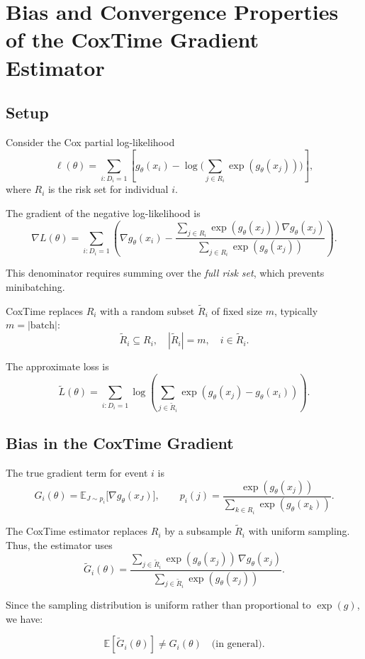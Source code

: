 \documentclass{article}
\begin{document}
\section{Bias and Convergence Properties of the CoxTime Gradient Estimator}

\subsection{Setup}

Consider the Cox partial log-likelihood
\[
\ell(\theta)
=
\sum_{i: D_i = 1}
\left[
g_\theta(x_i)
-
\log \Big( \sum_{j \in R_i} \exp(g_\theta(x_j)) \Big)
\right],
\]
where $R_i$ is the risk set for individual $i$.

The gradient of the negative log-likelihood is
\[
\nabla L(\theta)
=
\sum_{i : D_i = 1}
\left(
\nabla g_\theta(x_i)
-
\frac{\sum_{j \in R_i} \exp(g_\theta(x_j)) \nabla g_\theta(x_j)}
{\sum_{j \in R_i} \exp(g_\theta(x_j))}
\right).
\]

This denominator requires summing over the \textit{full risk set}, which prevents minibatching.

CoxTime replaces $R_i$ with a random subset $\widetilde{R}_i$ of fixed size $m$, typically $m = |\text{batch}|$:
\[
\widetilde{R}_i \subseteq R_i,\quad |\widetilde{R}_i| = m,\quad i\in \widetilde{R}_i.
\]

The approximate loss is
\[
\widetilde{L}(\theta)
=
\sum_{i : D_i = 1}
\log \left(
\sum_{j \in \widetilde{R}_i}
\exp(g_\theta(x_j) - g_\theta(x_i))
\right).
\]

\subsection{Bias in the CoxTime Gradient}

The true gradient term for event $i$ is
\[
G_i(\theta)
=
\mathbb{E}_{J \sim p_i}
\big[
\nabla g_\theta(x_J)
\big],
\qquad
p_i(j) = \frac{\exp(g_\theta(x_j))}{\sum_{k \in R_i} \exp(g_\theta(x_k))}.
\]

The CoxTime estimator replaces $R_i$ by a subsample $\widetilde{R}_i$ with uniform sampling.
Thus, the estimator uses
\[
\widetilde{G}_i(\theta)
=
\frac{\sum_{j \in \widetilde{R}_i}
\exp(g_\theta(x_j))\,\nabla g_\theta(x_j)}
{\sum_{j \in \widetilde{R}_i}
\exp(g_\theta(x_j))}.
\]

Since the sampling distribution is uniform rather than proportional to $\exp(g)$, we have:

\[
\mathbb{E}[\widetilde{G}_i(\theta)]
\neq
G_i(\theta)
\quad\text{(in general)}.
\]
\end{document}
